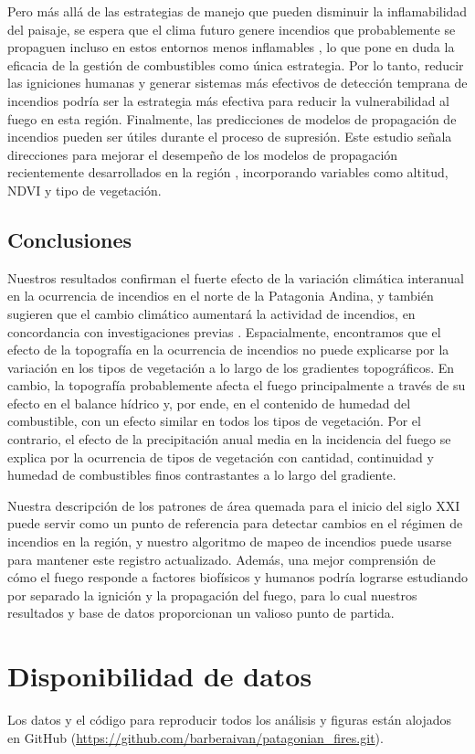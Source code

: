 Pero más allá de las estrategias de manejo que pueden disminuir la inflamabilidad del paisaje, se espera que el clima futuro genere incendios que probablemente se propaguen incluso en estos entornos menos inflamables \citep{cawson_atmospheric_2024}, lo que pone en duda la eficacia de la gestión de combustibles como única estrategia. Por lo tanto, reducir las igniciones humanas y generar sistemas más efectivos de detección temprana de incendios podría ser la estrategia más efectiva para reducir la vulnerabilidad al fuego en esta región. Finalmente, las predicciones de modelos de propagación de incendios pueden ser útiles durante el proceso de supresión. Este estudio señala direcciones para mejorar el desempeño de los modelos de propagación recientemente desarrollados en la región \citep{morales_stochastic_2015, laneri_first_2020}, incorporando variables como altitud, NDVI y tipo de vegetación.

\subsection{Conclusiones}

Nuestros resultados confirman el fuerte efecto de la variación climática interanual en la ocurrencia de incendios en el norte de la Patagonia Andina, y también sugieren que el cambio climático aumentará la actividad de incendios, en concordancia con investigaciones previas \citep{kitzberger_projections_2022}. Espacialmente, encontramos que el efecto de la topografía en la ocurrencia de incendios no puede explicarse por la variación en los tipos de vegetación a lo largo de los gradientes topográficos. En cambio, la topografía probablemente afecta el fuego principalmente a través de su efecto en el balance hídrico y, por ende, en el contenido de humedad del combustible, con un efecto similar en todos los tipos de vegetación. Por el contrario, el efecto de la precipitación anual media en la incidencia del fuego se explica por la ocurrencia de tipos de vegetación con cantidad, continuidad y humedad de combustibles finos contrastantes a lo largo del gradiente.

Nuestra descripción de los patrones de área quemada para el inicio del siglo XXI puede servir como un punto de referencia para detectar cambios en el régimen de incendios en la región, y nuestro algoritmo de mapeo de incendios puede usarse para mantener este registro actualizado. Además, una mejor comprensión de cómo el fuego responde a factores biofísicos y humanos podría lograrse estudiando por separado la ignición y la propagación del fuego, para lo cual nuestros resultados y base de datos proporcionan un valioso punto de partida.

\section*{Disponibilidad de datos}

Los datos y el código para reproducir todos los análisis y figuras están alojados en GitHub (\url{https://github.com/barberaivan/patagonian_fires.git}).